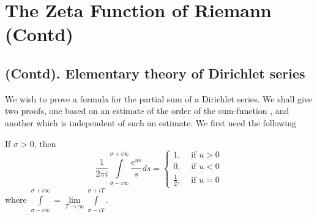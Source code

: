 \chapter{The Zeta Function of Riemann (Contd)}\label{chap10}

\setcounter{section}{1}
\section{(Contd). Elementary theory of Dirichlet  series}\label{chap10:sec2}\pageoriginale

We wish to prove a formula for the partial sum of a Dirichlet
series. We shall give two proofs, one based on an estimate of the
order of the sum-function \cite{key10}, and another
\cite[Lec. \ref{chap4}]{key14}  which is independent of such an estimate. We
first need the following 

\setcounter{lem}{0}
\begin{lem}\label{chap10:lem1}
If $\sigma >0$, then 
$$
\frac{1}{2\pi i } \int\limits^{\sigma + i \infty}_{\sigma - i \infty}
\frac{e^{us}}{s} ds =
\begin{cases}
1, & \text{ if } u > 0\\
0, & \text{ if } u < 0\\
\frac{1}{2}, & \text{ if } u = 0
\end{cases}
$$
where $\int\limits^{\sigma + i \infty}_{\sigma -i \infty} =
\lim\limits_{T \to \infty} \int\limits^{\sigma + i T}_{\sigma -iT}$.
\end{lem}

